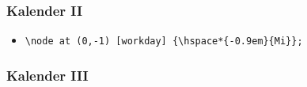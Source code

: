 \documentclass[14pt,ngerman]{beamer}
\begin{document}
\begin{frame}[containsverbatim]
\frametitle{Kalender II}

\begin{itemize}
	\item \lstinline|\node at (0,-1) [workday] {\hspace*{-0.9em}{Mi}};|
\end{itemize}\vspace*{-0.5cm}

\begin{center}
\end{center}
\end{frame}


\begin{frame}[containsverbatim]
\frametitle{Kalender III}

\begin{center}
\end{center}
\end{frame}
\end{document}
